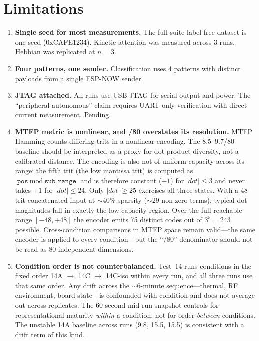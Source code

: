 \documentclass[11pt,letterpaper]{article}
\begin{document}
\section{Limitations}
\label{sec:limitations}

\begin{enumerate}
\item \textbf{Single seed for most measurements.} The full-suite label-free dataset is one seed (0xCAFE1234). Kinetic attention was measured across 3 runs. Hebbian was replicated at $n=3$.

\item \textbf{Four patterns, one sender.} Classification uses 4 patterns with distinct payloads from a single ESP-NOW sender.

\item \textbf{JTAG attached.} All runs use USB-JTAG for serial output and power. The ``peripheral-autonomous'' claim requires UART-only verification with direct current measurement. Pending.

\item \textbf{MTFP metric is nonlinear, and /80 overstates its resolution.} MTFP Hamming counts differing trits in a nonlinear encoding. The 8.5--9.7/80 baseline should be interpreted as a proxy for dot-product diversity, not a calibrated distance. The encoding is also not of uniform capacity across its range: the fifth trit (the low mantissa trit) is computed as $\texttt{pos} \bmod \texttt{sub\_range}$ and is therefore constant ($-1$) for $|dot| \le 3$ and never takes $+1$ for $|dot| \le 24$. Only $|dot| \ge 25$ exercises all three states. With a 48-trit concatenated input at $\sim$40\% sparsity ($\sim$29 non-zero terms), typical dot magnitudes fall in exactly the low-capacity region. Over the full reachable range $[-48, +48]$ the encoder emits 75 distinct codes out of $3^5 = 243$ possible. Cross-condition comparisons in MTFP space remain valid---the same encoder is applied to every condition---but the ``/80'' denominator should not be read as 80 independent dimensions.

\item \textbf{Condition order is not counterbalanced.} Test~14 runs conditions in the fixed order 14A $\to$ 14C $\to$ 14C-iso within every run, and all three runs use that same order. Any drift across the $\sim$6-minute sequence---thermal, RF environment, board state---is confounded with condition and does not average out across replicates. The 60-second mid-run snapshot controls for representational maturity \emph{within} a condition, not for order \emph{between} conditions. The unstable 14A baseline across runs (9.8, 15.5, 15.5) is consistent with a drift term of this kind.


\end{enumerate}
\end{document}
